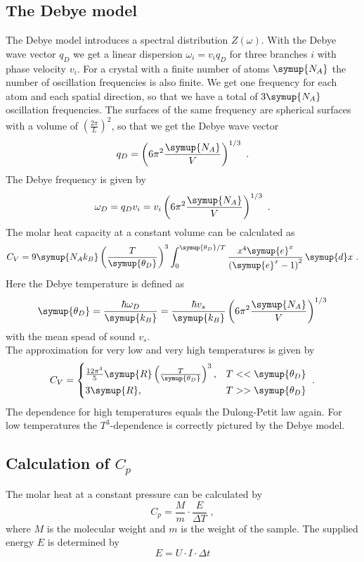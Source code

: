 \subsection{The Debye model}
\label{sec:debye}
The Debye model introduces a spectral distribution $Z(\omega)$. With the Debye wave vector $q_D$ we get a linear dispersion
$\omega_i = v_i q_D$ for three branches $i$ with phase velocity $v_i$. For a crystal with a finite number of atoms $\symup{N_A}$ the 
number of oscillation frequencies is also finite. We get one frequency for each atom and each spatial direction, so that we have a total 
of $3\symup{N_A}$ oscillation frequencies. The surfaces of the same frequency are spherical surfaces with a volume of $\left(\frac{2\pi}{L}\right)^2$, 
so that we get the Debye wave vector 
\begin{equation*}
    q_D = \left(6\pi^2\frac{\symup{N_A}}{V}\right)^{1/3} \,\,. 
\end{equation*}
The Debye frequency is given by 
\begin{equation*}
    \omega_D = q_D v_i = v_i \left(6\pi^2 \frac{\symup{N_A}}{V}\right)^{1/3} \,\, .
\end{equation*}
The molar heat capacity at a constant volume can be calculated as 
\begin{equation*}
    C_V = 9\symup{N_A k_B}\left(\frac{T}{\symup{\theta_D}}\right)^3 \int_{0}^{\symup{\theta_D}/T}\frac{x^4\symup{e}^x}{\left(\symup{e}^x-1\right)^2}\, \symup{d}x \,\, .
\end{equation*}
Here the Debye temperature is defined as
\begin{equation*}
    \symup{\theta_D} = \frac{\hbar \omega_D}{\symup{k_B}} = \frac{\hbar v_s}{\symup{k_B}}\left(6\pi^2\frac{\symup{N_A}}{V}\right)^{1/3}
\end{equation*}
with the mean spead of sound $v_s$. \\
The approximation for very low and very high temperatures is given by 
\begin{equation*}
    C_V = 
    \begin{cases}
        \frac{12\pi^4}{5}\symup{R}\left(\frac{T}{\symup{\theta_D}}\right)^3 , & T << \symup{\theta_D} \\
        3\symup{R} , & T>> \symup{\theta_D}
    \end{cases}
    \,\, .
\end{equation*}
The dependence for high temperatures equals the Dulong-Petit law again. For low temperatures the $T^3$-dependence is correctly pictured by 
the Debye model.

\subsection{Calculation of $C_p$}
The molar heat at a constant pressure can be calculated by 
\begin{equation*}
    C_p = \frac{M}{m} \cdot \frac{E}{\Delta T} \,\, , 
\end{equation*}
where $M$ is the molecular weight and $m$ is the weight of the sample. 
The supplied energy $E$ is determined by 
\begin{equation*}
    E = U \cdot I \cdot \Delta t
\end{equation*}